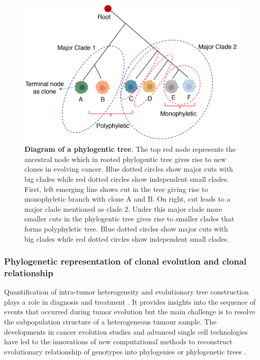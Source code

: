  \begin{figure}
\centering
\includegraphics[width=\textwidth]{Figures/chap1/phylogenetictree.png}
	\caption[Diagram of a phylogentic tree]
	{\small
	    \textbf{Diagram of a phylogentic tree}.
	 The top red node represents the ancestral node which in rooted phylogentic tree gives rise to new clones in evolving cancer.  Blue dotted circles show major cuts with big clades while red dotted circles show independent small clades. First, left emerging line shows cut in the tree giving rise to monophyletic branch with clone A and B. On right, cut leads to a major clade mentioned as clade 2. Under this major clade more smaller cuts in the phylogentic tree gives rise to smaller clades that forms polyphyletic tree. Blue dotted circles show major cuts with big clades while red dotted circles show independent small clades.
	}
	\label{fig:phylogentictree}
\end{figure}
 \subsubsection{Phylogenetic representation of clonal evolution and clonal relationship}
 Quantification of intra-tumor heterogeneity and evolutionary tree construction plays a role in diagnosis and treatment \cite{burrell2013causes, tabassum2015tumorigenesis}. It provides insights into the sequence of events that occurred during tumor evolution but the main challenge is to resolve the subpopulation structure of a heterogeneous tumour sample. The developments in cancer evolution studies and advanced single cell technologies \cite{laks2019clonal} have led to the innovations of new computational methods to reconstruct evolutionary relationship of genotypes into phylogenies or phylogenetic trees \cite{schwartz2017evolution}. 

